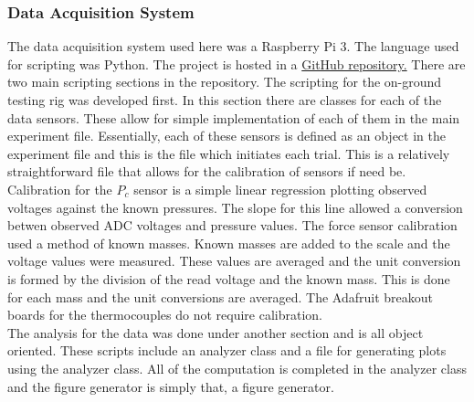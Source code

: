 \subsubsection{Data Acquisition System}
The data acquisition system used here was a Raspberry Pi 3. The language used for scripting was Python. The project is hosted in a \href{https://github.com/maxmhuggins/RCS_HAB/tree/master/On_Ground_Testing/Code}{GitHub repository.} There are two main scripting sections in the repository. The scripting for the on-ground testing rig was developed first. In this section there are classes for each of the data sensors. These allow for simple implementation of each of them in the main experiment file. Essentially, each of these sensors is defined as an object in the experiment file and this is the file which initiates each trial. This is a relatively straightforward file that allows for the calibration of sensors if need be. Calibration for the $P_c$ sensor is a simple linear regression plotting observed voltages against the known pressures. The slope for this line allowed a conversion betwen observed ADC voltages and pressure values. The force sensor calibration used a method of known masses. Known masses are added to the scale and the voltage values were measured. These values are averaged and the unit conversion is formed by the division of the read voltage and the known mass. This is done for each mass and the unit conversions are averaged. The Adafruit breakout boards for the thermocouples do not require calibration.\\
The analysis for the data was done under another section and is all object oriented. These scripts include an analyzer class and a file for generating plots using the analyzer class. All of the computation is completed in the analyzer class and the figure generator is simply that, a figure generator.